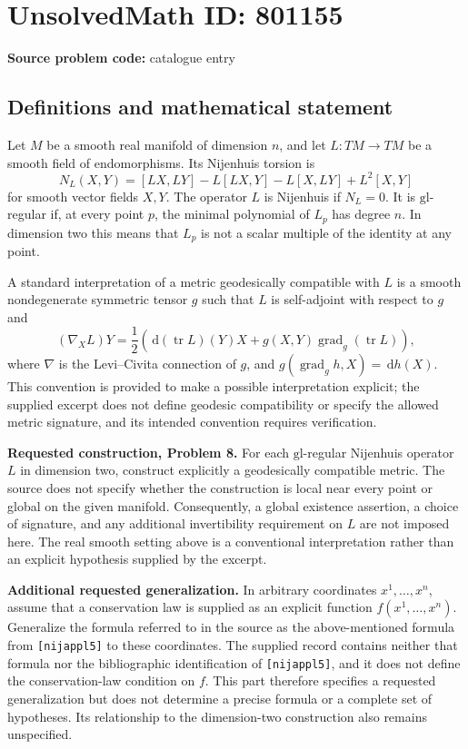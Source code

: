 \documentclass[11pt]{article}
\newcommand{\dd}{\,\mathrm{d}}
\begin{document}
\section*{UnsolvedMath ID: 801155}
\textbf{Source problem code:} catalogue entry
\subsection{Definitions and mathematical statement}
Let \(M\) be a smooth real manifold of dimension \(n\), and let \(L\colon TM\to TM\) be a smooth field of endomorphisms. Its Nijenhuis torsion is
\[
N_L(X,Y)=[LX,LY]-L[LX,Y]-L[X,LY]+L^2[X,Y]
\]
for smooth vector fields \(X,Y\). The operator \(L\) is Nijenhuis if \(N_L=0\). It is \(\mathrm{gl}\)-regular if, at every point \(p\), the minimal polynomial of \(L_p\) has degree \(n\). In dimension two this means that \(L_p\) is not a scalar multiple of the identity at any point.

A standard interpretation of a metric geodesically compatible with \(L\) is a smooth nondegenerate symmetric tensor \(g\) such that \(L\) is self-adjoint with respect to \(g\) and
\[
(\nabla_XL)Y
=\frac12\left(\dd(\operatorname{tr}L)(Y)X
+g(X,Y)\operatorname{grad}_g(\operatorname{tr}L)\right),
\]
where \(\nabla\) is the Levi--Civita connection of \(g\), and \(g(\operatorname{grad}_g h,X)=\dd h(X)\). This convention is provided to make a possible interpretation explicit; the supplied excerpt does not define geodesic compatibility or specify the allowed metric signature, and its intended convention requires verification.

\textbf{Requested construction, Problem 8.} For each \(\mathrm{gl}\)-regular Nijenhuis operator \(L\) in dimension two, construct explicitly a geodesically compatible metric. The source does not specify whether the construction is local near every point or global on the given manifold. Consequently, a global existence assertion, a choice of signature, and any additional invertibility requirement on \(L\) are not imposed here. The real smooth setting above is a conventional interpretation rather than an explicit hypothesis supplied by the excerpt.

\textbf{Additional requested generalization.} In arbitrary coordinates \(x^1,\ldots,x^n\), assume that a conservation law is supplied as an explicit function \(f(x^1,\ldots,x^n)\). Generalize the formula referred to in the source as the above-mentioned formula from \texttt{[nijappl5]} to these coordinates. The supplied record contains neither that formula nor the bibliographic identification of \texttt{[nijappl5]}, and it does not define the conservation-law condition on \(f\). This part therefore specifies a requested generalization but does not determine a precise formula or a complete set of hypotheses. Its relationship to the dimension-two construction also remains unspecified.
\end{document}
